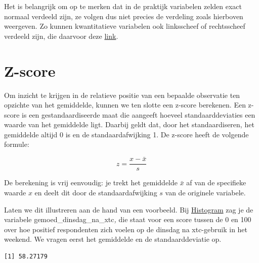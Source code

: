 \documentclass[
  letterpaper,
  DIV=11,
  numbers=noendperiod]{scrreprt}
\newenvironment{Shaded}{\begin{snugshade}}{\end{snugshade}}
\newcommand{\AttributeTok}[1]{\textcolor[rgb]{0.40,0.45,0.13}{#1}}
\newcommand{\CommentTok}[1]{\textcolor[rgb]{0.37,0.37,0.37}{#1}}
\newcommand{\ConstantTok}[1]{\textcolor[rgb]{0.56,0.35,0.01}{#1}}
\newcommand{\FunctionTok}[1]{\textcolor[rgb]{0.28,0.35,0.67}{#1}}
\newcommand{\NormalTok}[1]{\textcolor[rgb]{0.00,0.23,0.31}{#1}}
\newcommand{\SpecialCharTok}[1]{\textcolor[rgb]{0.37,0.37,0.37}{#1}}
\begin{document}
Het is belangrijk om op te merken dat in de praktijk variabelen zelden
exact normaal verdeeld zijn, ze volgen dus niet precies de verdeling
zoals hierboven weergeven. Zo kunnen kwantitatieve variabelen ook
linksscheef of rechtsscheef verdeeld zijn, die daarvoor deze
\href{https://www.scribbr.nl/statistiek/skewness-scheefheid/}{link}.

\section{Z-score}\label{sec-zscore}

Om inzicht te krijgen in de relatieve positie van een bepaalde
observatie ten opzichte van het gemiddelde, kunnen we ten slotte een
z-score berekenen. Een z-score is een gestandaardiseerde maat die
aangeeft hoeveel standaarddeviaties een waarde van het gemiddelde ligt.
Daarbij geldt dat, door het standaardiseren, het gemiddelde altijd 0 is
en de standaardafwijking 1. De z-score heeft de volgende formule:

\[ z=\frac{x-\bar{x}}{s} \]

De berekening is vrij eenvoudig: je trekt het gemiddelde \(\bar{x}\) af
van de specifieke waarde \(x\) en deelt dit door de standaardafwijking
\(s\) van de originele variabele.

Laten we dit illustreren aan de hand van een voorbeeld. Bij
\hyperref[sec-histogram]{Histogram} zag je de variabele
gemoed\_dinsdag\_na\_xtc\emph{,} die staat voor een score tussen de 0 en
100 over hoe positief respondenten zich voelen op de dinsdag na
xtc-gebruik in het weekend. We vragen eerst het gemiddelde en de
standaarddeviatie op.

\begin{Shaded}
\end{Shaded}

\begin{verbatim}
[1] 58.27179
\end{verbatim}

\begin{Shaded}
\end{Shaded}
\end{document}
